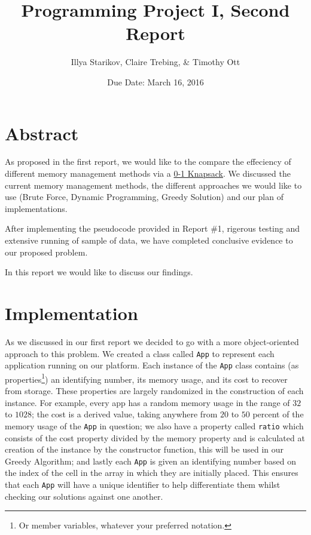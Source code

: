 \documentclass{article}
\title{Programming Project I, Second Report}
\author{Illya Starikov, Claire Trebing, \& Timothy Ott}
\date{Due Date: March 16, 2016}
\newcommand{\ignore}[1]{}
\begin{document}
\maketitle

\section{Abstract}
As proposed in the first report, we would like to the compare the effeciency of different memory management methods via a \href{https://en.wikipedia.org/wiki/Knapsack_problem#0.2F1_knapsack_problem}{0-1 Knapsack}. We discussed the current memory management methods, the different approaches we would like to use (Brute Force, Dynamic Programming, Greedy Solution) and our plan of implementations.

After implementing the pseudocode provided in Report \#1, rigerous testing and extensive running of sample of data, we have completed conclusive evidence to our proposed problem.

In this report we would like to discuss our findings.

\section{Implementation}
As we discussed in our first report we decided to go with a more object-oriented approach to this problem. We created a class called \texttt{App} to represent each application running on our platform. Each instance of the \texttt{App} class contains (as properties\footnote{Or member variables, whatever your preferred notation.}) an identifying number, its memory usage, and its cost to recover from storage. These properties are largely randomized in the construction of each instance. For example, every app has a random memory usage in the range of $32$ to $1028$; the cost is a derived value, taking anywhere from $20$ to $50$ percent of the memory usage of the \texttt{App} in question; we also have a property called \texttt{ratio} which consists of the cost property divided by the memory property and is calculated at creation of the instance by the constructor function, this will be used in our Greedy Algorithm; and lastly each \texttt{App} is given an identifying number based on the index of the cell in the array in which they are initially placed. This ensures that each \texttt{App} will have a unique identifier to help differentiate them whilst\ignore{Sorry, couldn't resist swapping out while for whilst!} checking our solutions against one another.
\end{document}
